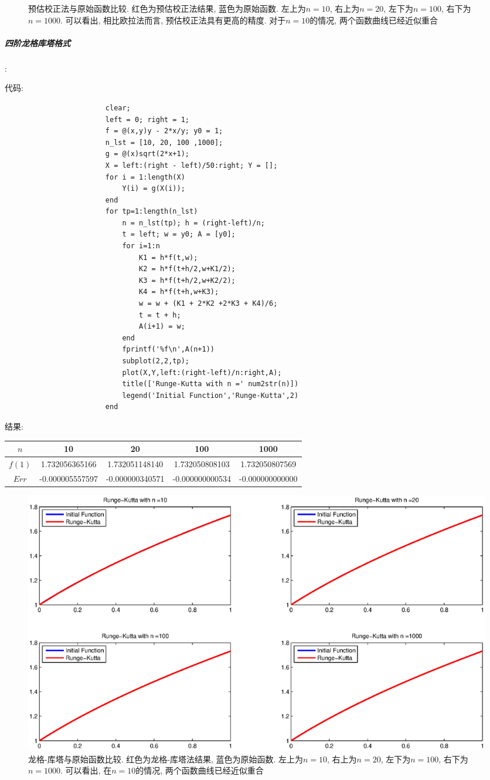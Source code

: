 \documentclass{article}
\begin{document}
\begin{CJK*}{UTF8}{song}
\begin{figure}[H]
						\caption{预估校正法与原始函数比较. 红色为预估校正法结果, 蓝色为原始函数. 左上为$n=10$, 右上为$n=20$, 左下为$n=100$, 右下为$n=1000$. 可以看出, 相比欧拉法而言, 预估校正法具有更高的精度. 对于$n=10$的情况, 两个函数曲线已经近似重合}
						\label{img_chapter5_1_2}
					\end{figure}
				\subparagraph{四阶龙格库塔格式}:
				
					代码:
					\begin{lstlisting}
						clear;
						left = 0; right = 1;
						f = @(x,y)y - 2*x/y; y0 = 1;
						n_lst = [10, 20, 100 ,1000];
						g = @(x)sqrt(2*x+1);
						X = left:(right - left)/50:right; Y = [];
						for i = 1:length(X)
							Y(i) = g(X(i));
						end
						for tp=1:length(n_lst)
							n = n_lst(tp); h = (right-left)/n;
							t = left; w = y0; A = [y0];
							for i=1:n
								K1 = h*f(t,w);
								K2 = h*f(t+h/2,w+K1/2);
								K3 = h*f(t+h/2,w+K2/2);
								K4 = h*f(t+h,w+K3);
								w = w + (K1 + 2*K2 +2*K3 + K4)/6;
								t = t + h;
								A(i+1) = w;
							end
							fprintf('%f\n',A(n+1))
							subplot(2,2,tp);
							plot(X,Y,left:(right-left)/n:right,A);
							title(['Runge-Kutta with n =' num2str(n)])
							legend('Initial Function','Runge-Kutta',2)
						end
					\end{lstlisting}
					结果:\\
					\begin{tabular}{|c|c|c|c|c|}
						\hline
						$n$    & 10 & 20 & 100 & 1000\\
						\hline
						$f(1)$ &1.732056365166 &1.732051148140 &1.732050808103 &1.732050807569\\
						\hline
						$Err$ &-0.000005557597&-0.000000340571&-0.000000000534&-0.000000000000 \\
						\hline
					\end{tabular}
					\begin{figure}[H]
						\centering
						\includegraphics[width=1.0\textwidth]{../chapter5_1_3.eps}
						\caption{龙格-库塔与原始函数比较. 红色为龙格-库塔法结果, 蓝色为原始函数. 左上为$n=10$, 右上为$n=20$, 左下为$n=100$, 右下为$n=1000$. 可以看出, 在$n=10$的情况, 两个函数曲线已经近似重合}
						\label{img_chapter5_1_3}
					\end{figure}

\end{CJK*}
\end{document}
